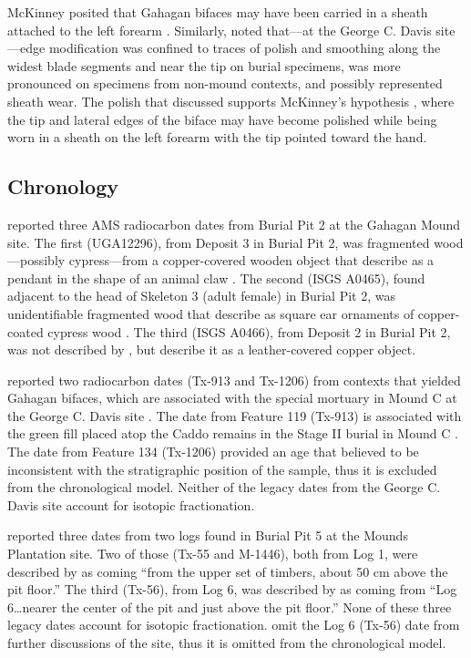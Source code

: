 \documentclass[review]{elsarticle}
\begin{document}
McKinney posited that Gahagan bifaces may have been carried in a sheath attached to the left forearm \citep{RN11561}. Similarly, \citet{RN3684} noted that---at the George C. Davis site---edge modification was confined to traces of polish and smoothing along the widest blade segments and near the tip on burial specimens, was more pronounced on specimens from non-mound contexts, and possibly represented sheath wear. The polish that \citet{RN3684} discussed supports McKinney’s hypothesis \citep{RN11561}, where the tip and lateral edges of the biface may have become polished while being worn in a sheath on the left forearm with the tip pointed toward the hand.

\subsection*{Chronology}

\citet[Table 1]{RN4783} reported three AMS radiocarbon dates from Burial Pit 2 at the Gahagan Mound site. The first (UGA12296), from Deposit 3 in Burial Pit 2, was fragmented wood—possibly cypress—from a copper-covered wooden object that \citet[99, Plate 29, No. 2, Object 5]{RN5274} describe as a pendant in the shape of an animal claw \citep{RN4783}. The second (ISGS A0465), found adjacent to the head of Skeleton 3 (adult female) in Burial Pit 2, was unidentifiable fragmented wood that \citet[96, Plate 21 and 28, Nos. 2-3]{RN5274} describe as square ear ornaments of copper-coated cypress wood \citep{RN4783}. The third (ISGS A0466), from Deposit 2 in Burial Pit 2, was not described by \citet[96]{RN5274}, but \citet[62]{RN4783} describe it as a leather-covered copper object.

\citet[Table 1]{RN3714} reported two radiocarbon dates (Tx-913 and Tx-1206) from contexts that yielded Gahagan bifaces, which are associated with the special mortuary in Mound C at the George C. Davis site \citep[Table 5]{RN3714}. The date from Feature 119 (Tx-913) is associated with the green fill placed atop the Caddo remains in the Stage II burial in Mound C \citep{RN3714}. The date from Feature 134 (Tx-1206) provided an age that \citet{RN3714} believed to be inconsistent with the stratigraphic position of the sample, thus it is excluded from the chronological model. Neither of the legacy dates from the George C. Davis site account for isotopic fractionation.

\citet[72]{RN11561} reported three dates from two logs found in Burial Pit 5 at the Mounds Plantation site. Two of those (Tx-55 and M-1446), both from Log 1, were described by \citet[72]{RN11561} as coming “from the upper set of timbers, about 50 cm above the pit floor.” The third (Tx-56), from Log 6, was described by \citet[72]{RN11561} as coming from “Log 6…nearer the center of the pit and just above the pit floor.” None of these three legacy dates account for isotopic fractionation. \citet{RN11561} omit the Log 6 (Tx-56) date from further discussions of the site, thus it is omitted from the chronological model.
\end{document}
